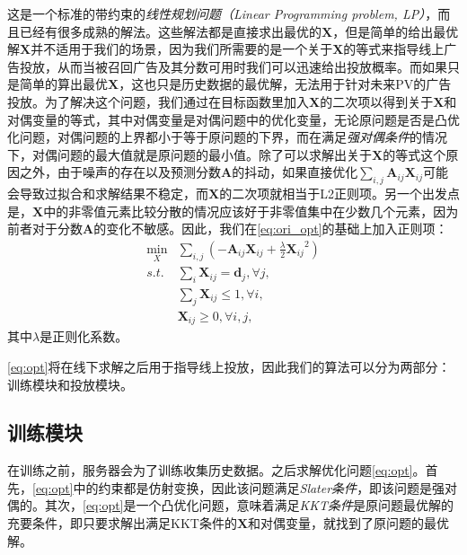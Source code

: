 这是一个标准的带约束的\textit{线性规划问题（Linear Programming problem, LP）}，而且已经有很多成熟的解法。这些解法都是直接求出最优的$\bm{X}$，但是简单的给出最优解$\bm{X}$并不适用于我们的场景，因为我们所需要的是一个关于$\bm{X}$的等式来指导线上广告投放，从而当被召回广告及其分数可用时我们可以迅速给出投放概率。而如果只是简单的算出最优$\bm{X}$，这也只是历史数据的最优解，无法用于针对未来PV的广告投放。为了解决这个问题，我们通过在目标函数里加入$\bm{X}$的二次项以得到关于$\bm{X}$和对偶变量的等式，其中对偶变量是对偶问题中的优化变量，无论原问题是否是凸优化问题，对偶问题的上界都小于等于原问题的下界，而在满足\textit{强对偶条件}的情况下，对偶问题的最大值就是原问题的最小值。除了可以求解出关于$\bm{X}$的等式这个原因之外，由于噪声的存在以及预测分数$\bm{A}$的抖动，如果直接优化$\sum_{i,j} \bm{A}_{ij}\bm{X}_{ij}$可能会导致过拟合和求解结果不稳定，而$\bm{X}$的二次项就相当于L2正则项。另一个出发点是，$\bm{X}$中的非零值元素比较分散的情况应该好于非零值集中在少数几个元素，因为前者对于分数$\bm{A}$的变化不敏感。因此，我们在\eqref{eq:ori_opt}的基础上加入正则项：
\begin{equation}
\begin{aligned}
\min_X &\sum_{i,j}  (-\bm{A}_{ij}\bm{X}_{ij} + \frac{\lambda}{2}{\bm{X}_{ij}}^2) \\
s.t. & \sum_i \bm{X}_{ij} = \bm{d}_j, \forall j, \\
& \sum_j \bm{X}_{ij} \le 1, \forall i, \\
& \bm{X}_{ij} \ge 0, \forall i, j, 
\label{eq:opt}
\end{aligned}
\end{equation}
其中$\lambda$是正则化系数。

\eqref{eq:opt}将在线下求解之后用于指导线上投放，因此我们的算法可以分为两部分：训练模块和投放模块。

\subsection{训练模块} \label{subsec:train}

在训练之前，服务器会为了训练收集历史数据。之后求解优化问题\eqref{eq:opt}。首先，\eqref{eq:opt}中的约束都是仿射变换，因此该问题满足\textit{Slater条件}，即该问题是强对偶的。其次，\eqref{eq:opt}是一个凸优化问题，意味着满足\textit{KKT条件}是原问题最优解的充要条件，即只要求解出满足KKT条件的$\bm{X}$和对偶变量，就找到了原问题的最优解。
	
